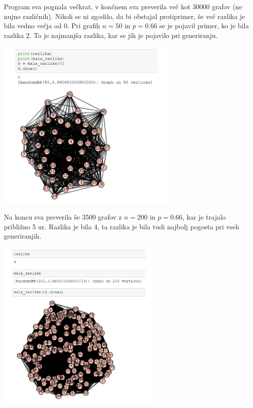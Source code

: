 \documentclass[10pt, a4paper]{article}
\begin{document}
Program sva pognala večkrat, v končnem sva preverila več kot 30000 grafov (ne nujno različnih). Nikoli se ni zgodilo, da bi obstajal protiprimer, še več razlika je bila vedno večja od 0. Pri grafih $n=50$ in $p=0.66$ se je pojavil primer, ko je bila razlika 2. To je najmanjša razlika, kar se jih je pojavilo pri generiranju.

\begin{center}
\includegraphics[height=8.5cm]{graf_razlika_2}
\end{center} 

Na koncu sva preverila še 3500 grafov z $n=200$ in $p=0.66$, kar je trajalo približno 5 ur. Razlika je bila 4, ta razlika je bila tudi najbolj pogosta pri vseh generiranjih.

\begin{center}
\includegraphics[height=8.5cm]{graf_200}
\end{center}
\end{document}
